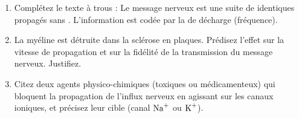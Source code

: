 \documentclass[11pt]{article}
\begin{document}
\begin{exercice}
\begin{enumerate}
    \item Complétez le texte à trous : Le message nerveux est une suite de \underline{\hspace{2cm}} identiques propagés sans \underline{\hspace{2cm}}. L'information est codée par la \underline{\hspace{2cm}} de décharge (fréquence).
    \item La myéline est détruite dans la sclérose en plaques. Prédisez l'effet sur la vitesse de propagation et sur la fidélité de la transmission du message nerveux. Justifiez.
    \item Citez deux agents physico-chimiques (toxiques ou médicamenteux) qui bloquent la propagation de l'influx nerveux en agissant sur les canaux ioniques, et précisez leur cible (canal $\ce{Na+}$ ou $\ce{K+}$).
\end{enumerate}
\end{exercice}
\end{document}
